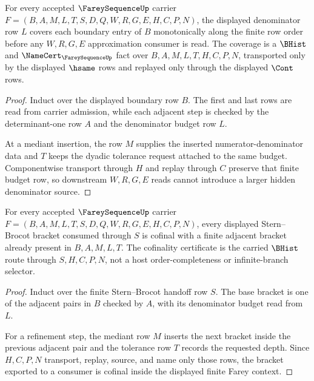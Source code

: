 \begin{theorem}
\label{thm:fareysequence-denominator-monotone-coverage}
For every accepted $\FareySequenceUp$ carrier $F=(B,A,M,L,T,S,D,Q,W,R,G,E,H,C,P,N)$, the displayed denominator row $L$ covers each boundary entry of $B$ monotonically along the finite row order before any $W,R,G,E$ approximation consumer is read. The coverage is a $\BHist$ and $\NameCert_{\FareySequenceUp}$ fact over $B,A,M,L,T,H,C,P,N$, transported only by the displayed $\hsame$ rows and replayed only through the displayed $\Cont$ rows.
\end{theorem}
\begin{proof}
Induct over the displayed boundary row $B$. The first and last rows are read from carrier admission, while each adjacent step is checked by the determinant-one row $A$ and the denominator budget row $L$.

At a mediant insertion, the row $M$ supplies the inserted numerator-denominator data and $T$ keeps the dyadic tolerance request attached to the same budget. Componentwise transport through $H$ and replay through $C$ preserve that finite budget row, so downstream $W,R,G,E$ reads cannot introduce a larger hidden denominator source.
\end{proof}

\begin{theorem}
\label{thm:fareysequence-stern-brocot-cofinal-bracket}
For every accepted $\FareySequenceUp$ carrier $F=(B,A,M,L,T,S,D,Q,W,R,G,E,H,C,P,N)$, every displayed Stern--Brocot bracket consumed through $S$ is cofinal with a finite adjacent bracket already present in $B,A,M,L,T$. The cofinality certificate is the carried $\BHist$ route through $S,H,C,P,N$, not a host order-completeness or infinite-branch selector.
\end{theorem}
\begin{proof}
Induct over the finite Stern--Brocot handoff row $S$. The base bracket is one of the adjacent pairs in $B$ checked by $A$, with its denominator budget read from $L$.

For a refinement step, the mediant row $M$ inserts the next bracket inside the previous adjacent pair and the tolerance row $T$ records the requested depth. Since $H,C,P,N$ transport, replay, source, and name only those rows, the bracket exported to a consumer is cofinal inside the displayed finite Farey context.
\end{proof}

